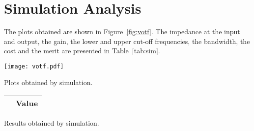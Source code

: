 \section{Simulation Analysis}
\label{sec:simulation}


The plots obtained are shown in Figure~\ref{fig:votf}. The impedance at the input and
output, the gain, the lower and upper cut-off frequencies, the bandwidth, the cost and
the merit are presented in Table~\ref{tab:sim}.\\

\begin{minipage}[b]{0.49\textwidth}
  \centering
  \texttt{[image: votf.pdf]}
  \captionsetup{type=figure}
  \caption{Plots obtained by simulation.}
  \label{fig:votf}  
\end{minipage}
\hfill
\begin{minipage}[b]{0.49\textwidth}
  \centering
  \begin{tabular}{|c|c|}
      \hline
       & \textbf{Value} \\ \hline
      
      
      
  \end{tabular}
  \captionsetup{type=table}
  \caption{Results obtained by simulation.}
  \label{tab:sim}
\end{minipage}
